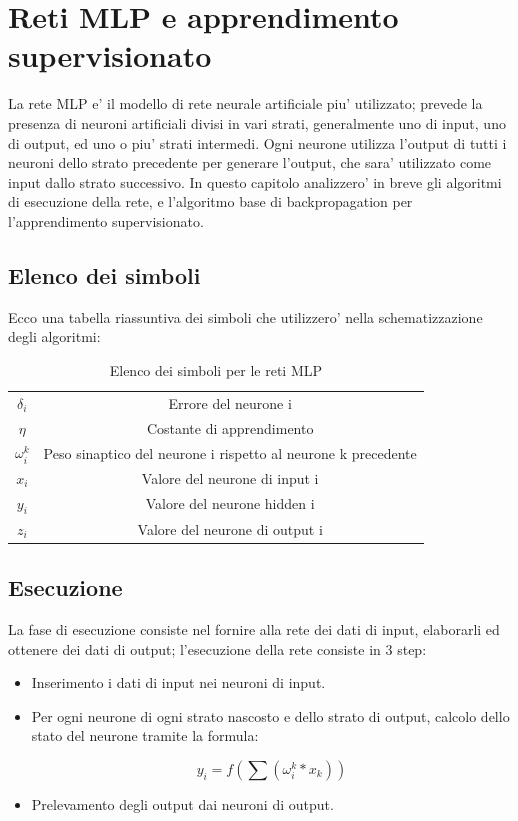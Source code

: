 \documentclass[a4paper,10pt]{report}
\begin{document}
\chapter{Reti MLP e apprendimento supervisionato}
La rete MLP e' il modello di rete neurale artificiale piu' utilizzato; 
prevede la presenza di neuroni artificiali
divisi in vari strati, generalmente uno di input, uno di output, ed uno
o piu' strati intermedi. Ogni neurone utilizza l'output di tutti i neuroni
dello strato precedente per generare l'output, che sara' utilizzato come
input dallo strato successivo. 
In questo capitolo analizzero' in breve gli algoritmi di esecuzione della
rete, e l'algoritmo base di backpropagation per l'apprendimento supervisionato.

\section{Elenco dei simboli}
Ecco una tabella riassuntiva dei simboli che utilizzero' nella schematizzazione
degli algoritmi:
\begin{table}[h]
	\begin{center}
	    \begin{tabular}{  c  c  }
	    $ \delta_i $ & Errore del neurone i \\ 
	    $ \eta $ & Costante di apprendimento \\ 
	    $ \omega_i^k $ & Peso sinaptico del neurone i rispetto al neurone k precedente \\
	    $ x_i $ & Valore del neurone di input i \\ 
	    $ y_i $ & Valore del neurone hidden i \\ 
	    $ z_i $ & Valore del neurone di output i \\ 
	    \end{tabular}
	\end{center}
	\caption{Elenco dei simboli per le reti MLP}
	\label{tab:mlp_symbols}
\end{table}


\section{Esecuzione}
La fase di esecuzione consiste nel fornire alla rete dei dati di input,
elaborarli ed ottenere dei dati di output; l'esecuzione della rete
consiste in 3 step:

\begin{itemize}
\item Inserimento i dati di input nei neuroni di input.

\item Per ogni neurone di ogni strato nascosto e dello strato di output, 
calcolo dello stato del neurone tramite la formula:

\[
	y_i = f(\sum (\omega_i^k * x_k))
\]

\item Prelevamento degli output dai neuroni di output.
\end{itemize}
\end{document}
